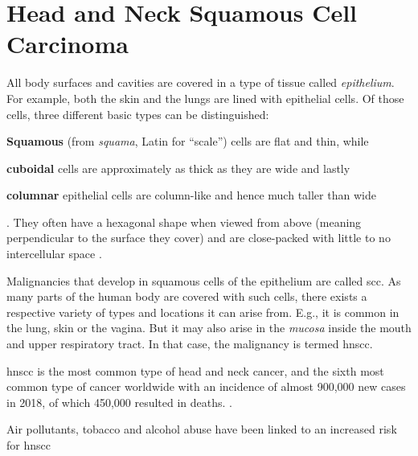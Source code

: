 \documentclass[\relativeRoot/main.tex]{subfiles}
\begin{document}
\section{Head and Neck Squamous Cell Carcinoma}
\label{sec:intro:hnscc}

All body surfaces and cavities are covered in a type of tissue called \emph{epithelium}. For example, both the skin and the lungs are lined with epithelial cells. Of those cells, three different basic types can be distinguished:
\begin{enumerate*}[label={(\arabic*)}]
    \item \textbf{Squamous} (from \emph{squama}, Latin for ``scale'') cells are flat and thin, while 
    \item \textbf{cuboidal} cells are approximately as thick as they are wide and lastly
    \item \textbf{columnar} epithelial cells are column-like and hence much taller than wide
\end{enumerate*}.
They often have a hexagonal shape when viewed from above (meaning perpendicular to the surface they cover) and are close-packed with little to no intercellular space \cite{marieb_human_1995}.

Malignancies that develop in squamous cells of the epithelium are called \gls{scc}. As many parts of the human body are covered with such cells, there exists a respective variety of types and locations it can arise from. E.g., it is common in the lung, skin or the vagina. But it may also arise in the \emph{mucosa} inside the mouth and upper respiratory tract. In that case, the malignancy is termed \gls{hnscc}.

\gls{hnscc} is the most common type of head and neck cancer, and the sixth most common type of cancer worldwide with an incidence of almost 900,000 new cases in 2018, of which 450,000 resulted in deaths. \cite{johnson_head_2020,ferlay_estimating_2019,bray_global_2018}.

Air pollutants, tobacco and alcohol abuse have been linked to an increased risk for \gls{hnscc} 
\end{document}
